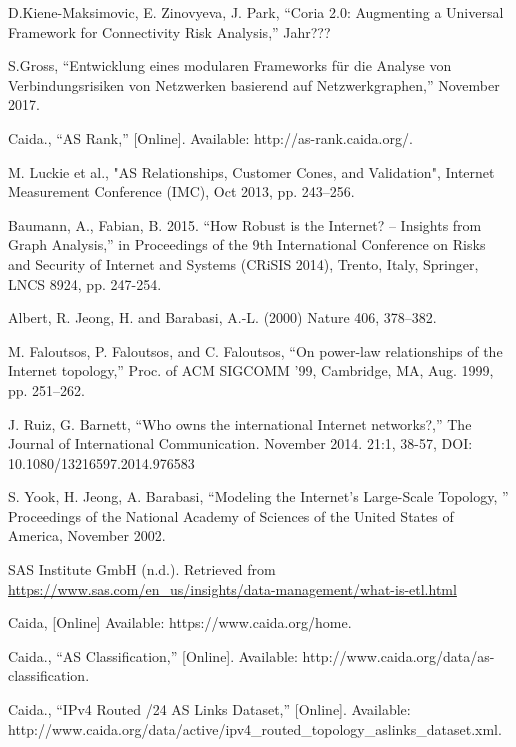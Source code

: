 \documentclass[conference, 11pt]{IEEEtran}
\begin{document}
\begin{thebibliography}{00}


 D.Kiene-Maksimovic, E. Zinovyeva, J. Park, ``Coria 2.0: Augmenting a Universal Framework for Connectivity Risk Analysis,'' Jahr???

S.Gross, ``Entwicklung eines modularen Frameworks für die Analyse von Verbindungsrisiken von Netzwerken basierend auf Netzwerkgraphen,'' November 2017.



Caida., ``AS Rank,'' [Online]. Available: http://as-rank.caida.org/.

M. Luckie et al., "AS Relationships, Customer Cones, and Validation", Internet Measurement Conference (IMC), Oct 2013, pp. 243--256.

Baumann, A., Fabian, B. 2015. “How Robust is the Internet? – Insights
from Graph Analysis,” in Proceedings of the 9th International
Conference on Risks and Security of Internet and Systems (CRiSIS
2014), Trento, Italy, Springer, LNCS 8924, pp. 247-254.

Albert, R. Jeong, H. and Barabasi, A.-L. (2000) Nature 406, 378–382.

M. Faloutsos, P. Faloutsos, and C. Faloutsos, “On power-law relationships of the Internet topology,” Proc. of ACM SIGCOMM ’99, Cambridge, MA, Aug. 1999, pp. 251–262.

J. Ruiz, G. Barnett, ``Who owns the international Internet networks?,'' The Journal of International
Communication. November 2014. 21:1, 38-57, DOI:
10.1080/13216597.2014.976583

S. Yook, H. Jeong, A. Barabasi, ``Modeling the Internet's Large-Scale Topology, '' Proceedings of the National Academy of Sciences of the 
United States of America, November 2002.

SAS Institute GmbH (n.d.). Retrieved from \url{https://www.sas.com/en_us/insights/data-management/what-is-etl.html}

Caida, [Online] Available: https://www.caida.org/home.

Caida., ``AS Classification,'' [Online]. Available: http://www.caida.org/data/as-
classification.

Caida., ``IPv4 Routed /24 AS Links Dataset,'' [Online]. Available: http://www.caida.org/data/active/ipv4\_routed\_topology\_aslinks\_dataset.xml.


\end{thebibliography}
\end{document}
